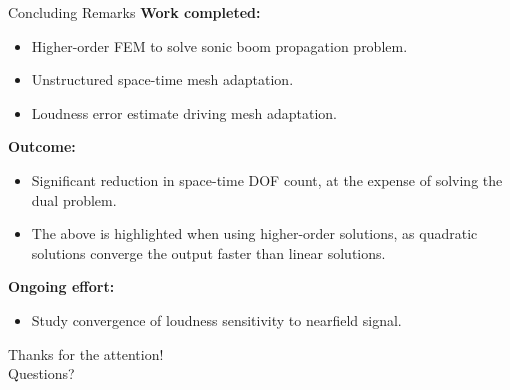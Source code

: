 \documentclass{beamer}
\begin{document}
{
\begin{frame}[t]{Concluding Remarks}
    \textbf{Work completed:}
    \begin{itemize}
      \item Higher-order FEM to solve sonic boom propagation problem.
      \item Unstructured space-time mesh adaptation.
      \item Loudness error estimate driving mesh adaptation.
    \end{itemize}

    \textbf{Outcome:}
    \begin{itemize}
      \item Significant reduction in space-time DOF count, at the expense of solving the dual problem.
      \item The above is highlighted when using higher-order solutions, as quadratic solutions converge the output faster than linear solutions.
    \end{itemize}

    \vspace{15pt}
    \textbf{Ongoing effort:}
    \begin{itemize}
      \item Study convergence of loudness sensitivity to nearfield signal.
    \end{itemize}
\end{frame}
}


\begin{frame}[plain]
  \vfill
  \centering
  {Thanks for the attention! \\ \small Questions?}
  \vfill
\end{frame}

\end{document}
